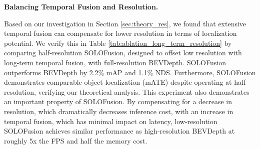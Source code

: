 \documentclass[runningheads, hyperfootnotes=false]{article}
\begin{document}
\noindent\textbf{Balancing Temporal Fusion and Resolution.}
\begin{table*}
\centering
\captionsetup{aboveskip=0pt}\captionsetup{belowskip=0pt}
\label{tab:ablation_long_term_resolution}
\tiny
{}
\end{table*} Based on our investigation in Section \ref{sec:theory_res}, we found that extensive temporal fusion can compensate for lower resolution in terms of localization potential. We verify this in Table \ref{tab:ablation_long_term_resolution} by comparing half-resolution SOLOFusion, designed to offset low resolution with long-term temporal fusion, with full-resolution BEVDepth. SOLOFusion outperforms BEVDepth by 2.2\% mAP and 1.1\% NDS. Furthermore, SOLOFusion demonstrates comparable object localization (mATE) despite operating at half resolution, verifying our theoretical analysis. This experiment also demonstrates an important property of SOLOFusion. By compensating for a decrease in resolution, which dramatically decreases inference cost, with an increase in temporal fusion, which has minimal impact on latency, low-resolution SOLOFusion achieves similar performance as high-resolution BEVDepth at roughly 5x the FPS and half the memory cost. 
\end{document}
